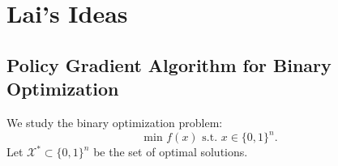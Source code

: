 \documentclass[
        11pt, %
	a4paper, %
]{LegrandOrangeBook}
\begin{document}


\pagestyle{empty} %

\tableofcontents %



\pagestyle{fancy} %

\cleardoublepage %


\chapterspaceabove{6.75cm} %
\chapterspacebelow{7.25cm} %



\chapter{Lai's Ideas}

\section{Policy Gradient Algorithm for Binary Optimization \cite{chen2023monte}}\label{sec:prob_model}

We study the binary optimization problem:
\begin{equation}
    \text{min } f(x) \text{ s.t. } x \in \{0,1\}^n. \tag{1}
\end{equation}
Let $\mathcal{X}^* \subset \{0,1\}^n$ be the set of optimal solutions.
\end{document}
